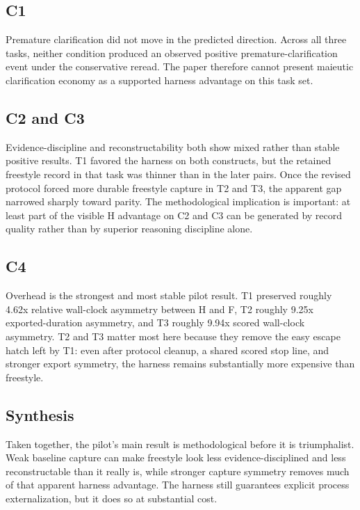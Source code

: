 \documentclass[conference]{IEEEtran}
\begin{document}
\subsection{C1}

Premature clarification did not move in the predicted direction. Across all three tasks,
neither condition produced an observed positive premature-clarification event under the
conservative reread. The paper therefore cannot present maieutic clarification economy
as a supported harness advantage on this task set.

\subsection{C2 and C3}

Evidence-discipline and reconstructability both show mixed rather than stable positive
results. T1 favored the harness on both constructs, but the retained freestyle record in
that task was thinner than in the later pairs. Once the revised protocol forced more
durable freestyle capture in T2 and T3, the apparent gap narrowed sharply toward
parity. The methodological implication is important: at least part of the visible H
advantage on C2 and C3 can be generated by record quality rather than by superior
reasoning discipline alone.

\subsection{C4}

Overhead is the strongest and most stable pilot result. T1 preserved roughly 4.62x
relative wall-clock asymmetry between H and F, T2 roughly 9.25x exported-duration
asymmetry, and T3 roughly 9.94x scored wall-clock asymmetry. T2 and T3 matter most here
because they remove the easy escape hatch left by T1: even after protocol cleanup, a
shared scored stop line, and stronger export symmetry, the harness remains substantially
more expensive than freestyle.

\subsection{Synthesis}

Taken together, the pilot's main result is methodological before it is triumphalist.
Weak baseline capture can make freestyle look less evidence-disciplined and less
reconstructable than it really is, while stronger capture symmetry removes much of that
apparent harness advantage. The harness still guarantees explicit process
externalization, but it does so at substantial cost.
\end{document}
